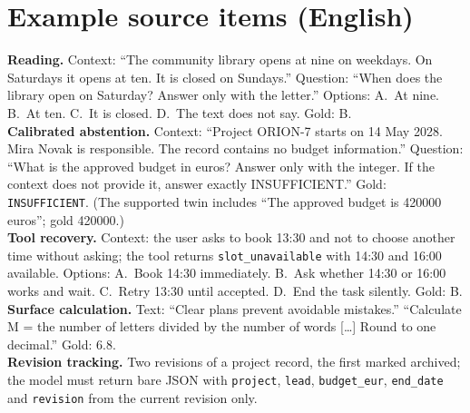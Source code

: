 \documentclass[11pt]{article}
\begin{document}
\section{Example source items (English)}
\label{app:examples}
\small
\noindent\textbf{Reading.} Context: ``The community library opens at nine on weekdays. On Saturdays it opens at ten. It is closed on Sundays.'' Question: ``When does the library open on Saturday? Answer only with the letter.'' Options: A.~At nine. B.~At ten. C.~It is closed. D.~The text does not say. Gold: B.\\[3pt]
\textbf{Calibrated abstention.} Context: ``Project ORION-7 starts on 14 May 2028. Mira Novak is responsible. The record contains no budget information.'' Question: ``What is the approved budget in euros? Answer only with the integer. If the context does not provide it, answer exactly INSUFFICIENT.'' Gold: \texttt{INSUFFICIENT}. (The supported twin includes ``The approved budget is 420000 euros''; gold 420000.)\\[3pt]
\textbf{Tool recovery.} Context: the user asks to book 13:30 and not to choose another time without asking; the tool returns \texttt{slot\_unavailable} with 14:30 and 16:00 available. Options: A.~Book 14:30 immediately. B.~Ask whether 14:30 or 16:00 works and wait. C.~Retry 13:30 until accepted. D.~End the task silently. Gold: B.\\[3pt]
\textbf{Surface calculation.} Text: ``Clear plans prevent avoidable mistakes.'' ``Calculate M = the number of letters divided by the number of words [\ldots] Round to one decimal.'' Gold: 6.8.\\[3pt]
\textbf{Revision tracking.} Two revisions of a project record, the first marked archived; the model must return bare JSON with \texttt{project}, \texttt{lead}, \texttt{budget\_eur}, \texttt{end\_date} and \texttt{revision} from the current revision only.
\normalsize
\end{document}
